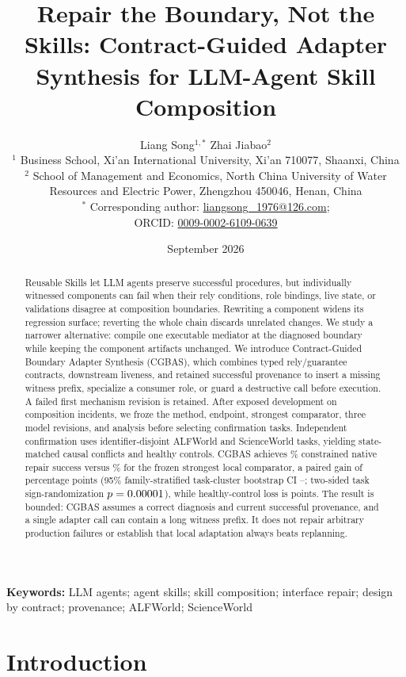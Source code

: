 \documentclass[10pt]{article}
\title{Repair the Boundary, Not the Skills: Contract-Guided Adapter Synthesis for LLM-Agent Skill Composition}
\author{%
\begin{tabular}{c}
Liang Song$^{1,*}$ \qquad Zhai Jiabao$^2$\\[4pt]
\small $^1$ Business School, Xi'an International University, Xi'an 710077, Shaanxi, China\\
\small $^2$ School of Management and Economics, North China University of Water\\
\small Resources and Electric Power, Zhengzhou 450046, Henan, China\\[2pt]
\small $^*$ Corresponding author: \href{mailto:liangsong_1976@126.com}{liangsong\_1976@126.com};\\
\small ORCID: \href{https://orcid.org/0009-0002-6109-0639}{0009-0002-6109-0639}
\end{tabular}%
}
\date{September 2026}
\begin{document}
\maketitle

\begin{abstract}
Reusable Skills let LLM agents preserve successful procedures, but individually
witnessed components can fail when their rely conditions, role bindings, live
state, or validations disagree at composition boundaries. Rewriting a component
widens its regression surface; reverting the whole chain discards unrelated
changes. We study a narrower alternative: compile one executable mediator at the
diagnosed boundary while keeping the component artifacts unchanged. We introduce
Contract-Guided Boundary Adapter Synthesis (CGBAS), which combines typed
rely/guarantee contracts, downstream liveness, and retained successful provenance
to insert a missing witness prefix, specialize a consumer role, or guard a
destructive call before execution. A failed first mechanism revision is retained.
After exposed development on \DevelopmentIncidentCount{} composition incidents,
we froze the method, endpoint, strongest comparator, three model revisions, and
analysis before selecting confirmation tasks. Independent confirmation uses
\ConfirmationRosterCount{} identifier-disjoint ALFWorld and ScienceWorld tasks,
yielding \ValidCausalCount{} state-matched causal conflicts and
\ValidControlCount{} healthy controls. CGBAS achieves
\PrimaryMethodRate\% constrained native repair success versus
\PrimaryComparatorRate\% for the frozen strongest local comparator, a paired
gain of \PrimaryGain{} percentage points (95\% family-stratified task-cluster
bootstrap CI \PrimaryCILow--\PrimaryCIHigh; two-sided task sign-randomization
$p=0.00001$), while healthy-control loss is \ControlLoss{} points. The result
is bounded: CGBAS assumes a correct diagnosis and current successful provenance,
and a single adapter call can contain a long witness prefix. It does not repair
arbitrary production failures or establish that local adaptation always beats
replanning.
\end{abstract}

\noindent\textbf{Keywords:} LLM agents; agent skills; skill composition;
interface repair; design by contract; provenance; ALFWorld; ScienceWorld

\section{Introduction}
\end{document}
